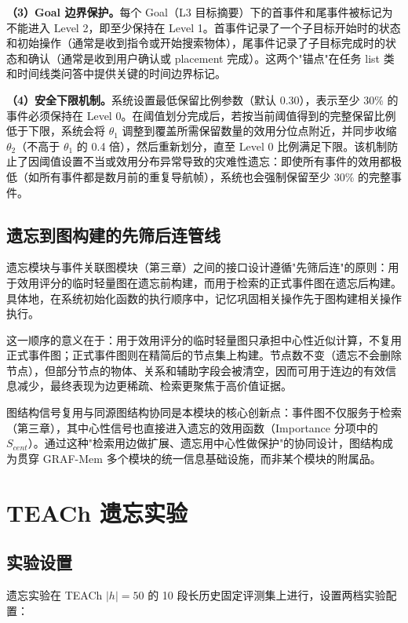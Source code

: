 \textbf{（3）Goal 边界保护。}每个 Goal（L3 目标摘要）下的首事件和尾事件被标记为不能进入 Level 2，即至少保持在 Level 1。首事件记录了一个子目标开始时的状态和初始操作（通常是收到指令或开始搜索物体），尾事件记录了子目标完成时的状态和确认（通常是收到用户确认或 placement 完成）。这两个"锚点"在任务 list 类和时间线类问答中提供关键的时间边界标记。

\textbf{（4）安全下限机制。}系统设置最低保留比例参数（默认 0.30），表示至少 30\% 的事件必须保持在 Level 0。在阈值划分完成后，若按当前阈值得到的完整保留比例低于下限，系统会将 $\theta_1$ 调整到覆盖所需保留数量的效用分位点附近，并同步收缩 $\theta_2$（不高于 $\theta_1$ 的 0.4 倍），然后重新划分，直至 Level 0 比例满足下限。该机制防止了因阈值设置不当或效用分布异常导致的灾难性遗忘：即使所有事件的效用都极低（如所有事件都是数月前的重复导航帧），系统也会强制保留至少 30\% 的完整事件。

\subsection{遗忘到图构建的先筛后连管线}

遗忘模块与事件关联图模块（第三章）之间的接口设计遵循"先筛后连"的原则：用于效用评分的临时轻量图在遗忘前构建，而用于检索的正式事件图在遗忘后构建。具体地，在系统初始化函数的执行顺序中，记忆巩固相关操作先于图构建相关操作执行。

这一顺序的意义在于：用于效用评分的临时轻量图只承担中心性近似计算，不复用正式事件图；正式事件图则在精简后的节点集上构建。节点数不变（遗忘不会删除节点），但部分节点的物体、关系和辅助字段会被清空，因而可用于连边的有效信息减少，最终表现为边更稀疏、检索更聚焦于高价值证据。

图结构信号复用与同源图结构协同是本模块的核心创新点：事件图不仅服务于检索（第三章），其中心性信号也直接进入遗忘的效用函数（Importance 分项中的 $S_{cent}$）。通过这种"检索用边做扩展、遗忘用中心性做保护"的协同设计，图结构成为贯穿 GRAF-Mem 多个模块的统一信息基础设施，而非某个模块的附属品。

\section{TEACh 遗忘实验}

\subsection{实验设置}

遗忘实验在 TEACh $|h|=50$ 的 10 段长历史固定评测集上进行，设置两档实验配置：

